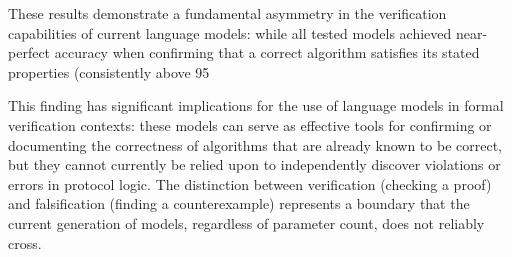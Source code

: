 These results demonstrate a fundamental asymmetry in the verification capabilities of current language models: while all tested models achieved near-perfect accuracy when confirming that a correct algorithm satisfies its stated properties (consistently above 95%

This finding has significant implications for the use of language models in formal verification contexts: these models can serve as effective tools for confirming or documenting the correctness of algorithms that are already known to be correct, but they cannot currently be relied upon to independently discover violations or errors in protocol logic. The distinction between verification (checking a proof) and falsification (finding a counterexample) represents a boundary that the current generation of models, regardless of parameter count, does not reliably cross.